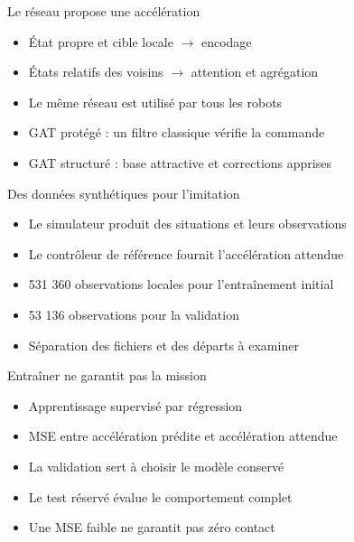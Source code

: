 \documentclass[aspectratio=169,11pt]{beamer}
\begin{document}
\begin{frame}{Le réseau propose une accélération}
\begin{itemize}\setlength{\itemsep}{4mm}
\item État propre et cible locale $\rightarrow$ encodage
\item États relatifs des voisins $\rightarrow$ attention et agrégation
\item Le même réseau est utilisé par tous les robots
\item GAT protégé : un filtre classique vérifie la commande
\item GAT structuré : base attractive et corrections apprises
\end{itemize}
\end{frame}

\begin{frame}{Des données synthétiques pour l’imitation}
\begin{itemize}\setlength{\itemsep}{4mm}
\item Le simulateur produit des situations et leurs observations
\item Le contrôleur de référence fournit l’accélération attendue
\item 531 360 observations locales pour l’entraînement initial
\item 53 136 observations pour la validation
\item Séparation des fichiers et des départs à examiner
\end{itemize}
\end{frame}

\begin{frame}{Entraîner ne garantit pas la mission}
\begin{itemize}\setlength{\itemsep}{4mm}
\item Apprentissage supervisé par régression
\item MSE entre accélération prédite et accélération attendue
\item La validation sert à choisir le modèle conservé
\item Le test réservé évalue le comportement complet
\item Une MSE faible ne garantit pas zéro contact
\end{itemize}
\end{frame}
\end{document}
